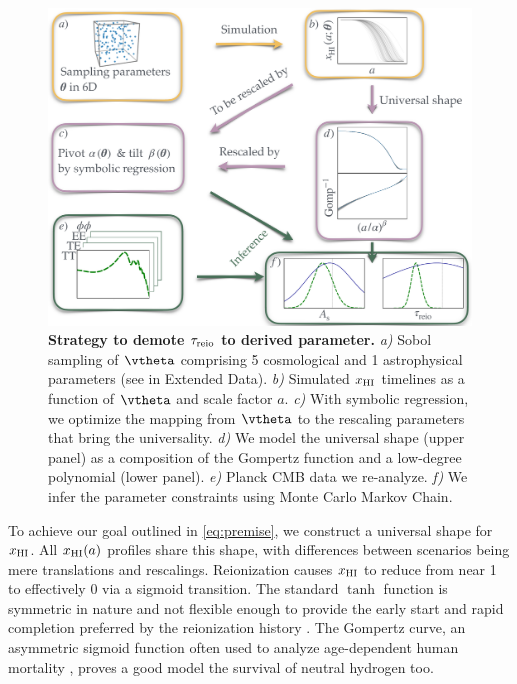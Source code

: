 \begin{figure}
\centering
\includegraphics[width=\linewidth]{figs/big_fig.pdf}
\caption{\textbf{Strategy to demote $\tau_{\mathrm{reio}}$ to derived parameter.}
\emph{a)} Sobol sampling of $\vtheta$ comprising 5 cosmological and 1
astrophysical parameters (see  in Extended Data).
\emph{b)} Simulated $x_{\mathrm{HI}}$ timelines as a function of $\vtheta$ and
scale factor $a$.
\emph{c)} With symbolic regression, we optimize the mapping from
$\vtheta$ to the rescaling parameters that bring the universality.
\emph{d)} We model the universal shape (upper panel) as a composition of
the Gompertz function and a low-degree polynomial (lower panel).
\emph{e)} Planck CMB data we re-analyze.
\emph{f)} We infer the parameter constraints using Monte Carlo Markov
Chain.}
\label{fig:big}
\end{figure}

To achieve our goal outlined in \cref{eq:premise}, we construct a
universal shape for $x_{\mathrm{HI}}$.
All $x_{\mathrm{HI}}(a)$ profiles share this shape, with differences between
scenarios being mere translations and rescalings.
Reionization causes $x_{\mathrm{HI}}$ to reduce from near 1 to effectively 0 via a
sigmoid transition.
The standard $\tanh$ function is symmetric in nature and not flexible
enough to provide the early start and rapid completion preferred by the
reionization history \cite{Trac2018, Doussot2019}.
The Gompertz curve, an asymmetric sigmoid function often used to analyze
age-dependent human mortality \cite{Gompertz1825}, proves a good model
the survival of neutral hydrogen too.

